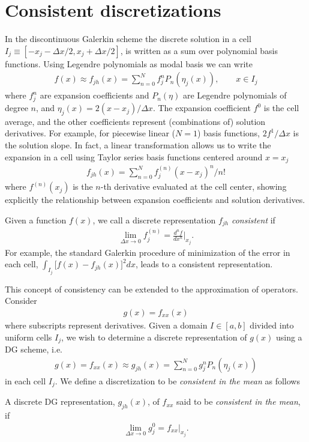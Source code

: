\documentclass[final]{siamltex}
\begin{document}
\section{Consistent discretizations}

In the discontinuous Galerkin scheme the discrete solution in a cell
$I_j\equiv [-x_j-\Delta x/2, x_j+\Delta x/2]$, is written as a sum
over polynomial basis functions. Using Legendre polynomials as modal
basis we can write
\begin{align}
  f(x) \approx f_{jh}(x) = \sum_{n=0}^N f_j^n P_n(\eta_j(x)),
  \qquad x \in I_j
\end{align}
where $f_j^n$ are expansion coefficients and $P_n(\eta)$ are Legendre
polynomials of degree $n$, and $\eta_j(x) = 2(x-x_j)/\Delta x$. The
expansion coefficient $f^0$ is the cell average, and the other
coefficients represent (combinations of) solution derivatives. For
example, for piecewise linear ($N=1$) basis functions, $2 f^1/\Delta
x$ is the solution slope. In fact, a linear transformation allows us
to write the expansion in a cell using Taylor series basis functions
centered around $x=x_j$
\begin{align}
  f_{jh}(x) = \sum_{n=0}^N f^{(n)}_j (x-x_j)^n/n!
\end{align}
where $f^{(n)}(x_j)$ is the $n$-th derivative evaluated at the cell
center, showing explicitly the relationship between expansion
coefficients and solution derivatives. 

Given a function $f(x)$, we call a discrete representation $f_{jh}$
\emph{consistent} if
\begin{align}
  \lim_{\Delta x \rightarrow 0} f_j^{(n)} = \frac{d^nf}{dx^n} \biggr|_{x_j}.
\end{align}
For example, the standard Galerkin procedure of minimization of the
error in each cell, $\int_{I_j} \big[f(x)-f_{jh}(x)\big]^2dx$, leads
to a consistent representation.

This concept of consistency can be extended to the approximation of
operators. Consider
\begin{align}
  g(x) = f_{xx}(x)
\end{align}
where subscripts represent derivatives. Given a domain $I\in[a,b]$
divided into uniform cells $I_j$, we wish to determine a discrete
representation of $g(x)$ using a DG scheme, i.e.
\begin{align}
  g(x) = f_{xx}(x) \approx g_{jh}(x) = \sum_{n=0}^N g_j^n P_n(\eta_j(x))
\end{align}
in each cell $I_j$. We define a discretization to be \emph{consistent
  in the mean} as follows
\begin{definition}
  A discrete DG representation, $g_{jh}(x)$, of $f_{xx}$ said to be
  \emph{consistent in the mean}, if
  \begin{align}
    \lim_{\Delta x\rightarrow 0} g_j^0 = f_{xx}|_{x_j}.
  \end{align}
\end{definition}
\end{document}

